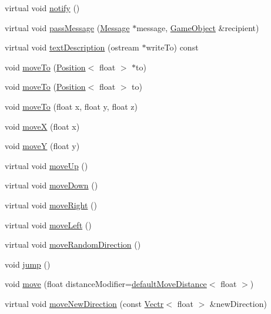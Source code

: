 \begin{DoxyCompactItemize}
virtual void \hyperlink{class_game_object_a9867e75f8cfc4df52d03467aca07a4ac}{notify} ()
\item 
virtual void \hyperlink{class_game_object_ad7f752f1e3c84bd74de6110c17df3938}{pass\-Message} (\hyperlink{struct_message}{Message} $\ast$message, \hyperlink{class_game_object}{Game\-Object} \&recipient)
\item 
virtual void \hyperlink{class_game_object_adc249c683994a9c74b518a82fc22dbab}{text\-Description} (ostream $\ast$write\-To) const 
\item 
void \hyperlink{class_game_object_ae483f641380cd7d30c8bc469ffa2b219}{move\-To} (\hyperlink{struct_position}{Position}$<$ float $>$ $\ast$to)
\item 
void \hyperlink{class_game_object_ac9da7fd4807118db721e2d1cbee69580}{move\-To} (\hyperlink{struct_position}{Position}$<$ float $>$ to)
\item 
void \hyperlink{class_game_object_a34a64493de5a087b7cb79e1fceb5db8e}{move\-To} (float x, float y, float z)
\item 
void \hyperlink{class_game_object_af0f7a85d5565aa73554140b7cb876af0}{move\-X} (float x)
\item 
void \hyperlink{class_game_object_ab7e675ee37da1f4dfe9ce59de2df3a25}{move\-Y} (float y)
\item 
virtual void \hyperlink{class_game_object_a2c4862885319288c746d8e1c454556b6}{move\-Up} ()
\item 
virtual void \hyperlink{class_game_object_ab2d6fdbc50ff110d3a6d101e3539dca9}{move\-Down} ()
\item 
virtual void \hyperlink{class_game_object_abb75fa4bde389384815abb7cacc35045}{move\-Right} ()
\item 
virtual void \hyperlink{class_game_object_a71152debfe014bef0efe7464dd45aacb}{move\-Left} ()
\item 
virtual void \hyperlink{class_game_object_ac279191d7c42ca8ad3e1dd2baf5a9519}{move\-Random\-Direction} ()
\item 
void \hyperlink{class_game_object_aa8b87ef4a487c54c1d5b327c001b5c84}{jump} ()
\item 
void \hyperlink{class_game_object_aebf4e54c90de73d56186beaebead1ccc}{move} (float distance\-Modifier=\hyperlink{_default_config_8h_ae612ff4d109725baa6322f37db537175}{default\-Move\-Distance}$<$ float $>$)
\item 
virtual void \hyperlink{class_game_object_a41d5ef30ab6863ac5277fbc37297b11b}{move\-New\-Direction} (const \hyperlink{struct_vectr}{Vectr}$<$ float $>$ \&new\-Direction)

\end{DoxyCompactItemize}
